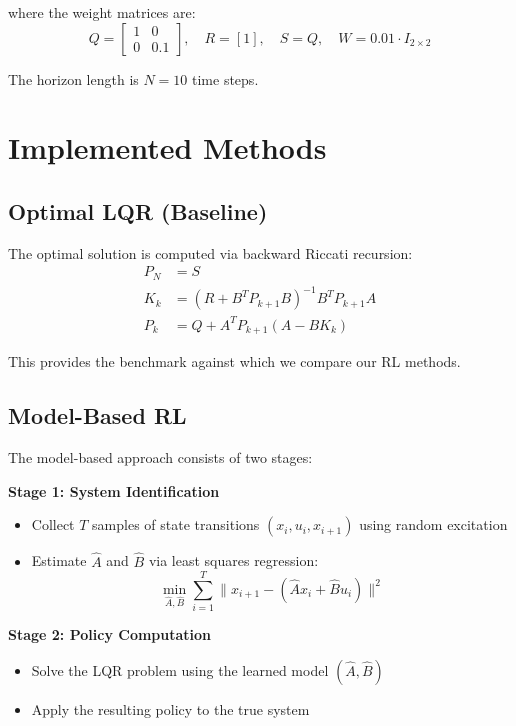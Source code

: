 \documentclass{report}
\begin{document}
where the weight matrices are:
\begin{equation}
    Q = \begin{bmatrix} 1 & 0 \\ 0 & 0.1 \end{bmatrix}, \quad R = [1], \quad S = Q, \quad W = 0.01 \cdot I_{2\times2}
\end{equation}

The horizon length is $N = 10$ time steps.

\section{Implemented Methods}

\subsection{Optimal LQR (Baseline)}

The optimal solution is computed via backward Riccati recursion:
\begin{align}
    P_N &= S \\
    K_k &= (R + B^T P_{k+1} B)^{-1} B^T P_{k+1} A \\
    P_k &= Q + A^T P_{k+1} (A - B K_k)
\end{align}

This provides the benchmark against which we compare our RL methods.

\subsection{Model-Based RL}

The model-based approach consists of two stages:

\textbf{Stage 1: System Identification}
\begin{itemize}
    \item Collect $T$ samples of state transitions $(x_i, u_i, x_{i+1})$ using random excitation
    \item Estimate $\hat{A}$ and $\hat{B}$ via least squares regression:
    \begin{equation}
        \min_{\hat{A}, \hat{B}} \sum_{i=1}^{T} \| x_{i+1} - (\hat{A}x_i + \hat{B}u_i) \|^2
    \end{equation}
\end{itemize}

\textbf{Stage 2: Policy Computation}
\begin{itemize}
    \item Solve the LQR problem using the learned model $(\hat{A}, \hat{B})$
    \item Apply the resulting policy to the true system
\end{itemize}
\end{document}
